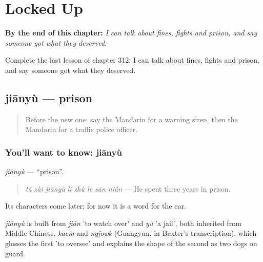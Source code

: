 
\chapter{Locked Up}
\label{ch:zh-locked-up}

\begin{chapteropening}
\textbf{By the end of this chapter:} \emph{I can talk about fines, fights and prison, and say someone got what they deserved.}

Complete the last lesson of chapter 312: I can talk about fines, fights and prison, and say someone got what they deserved.
\end{chapteropening}

\section[jiānyù]{jiānyù — prison}

\label{lesson:ZH-C312-jianyu}



\begin{quote}
Before the new one: say the Mandarin for a warning siren, then the Mandarin for a traffic police officer.
\end{quote}

\subsection*{You'll want to know: jiānyù}
\emph{jiānyù} — \textquotedblleft{}prison\textquotedblright{}.

\begin{quote}
\emph{tā zài jiānyù lǐ zhù le sān nián} — He spent three years in prison.
\end{quote}

Its characters come later; for now it is a word for the ear.

\begin{cousinweb}
\emph{jiānyù} is built from \emph{jiān} 'to watch over' and \emph{yù} 'a jail', both inherited from Middle Chinese, \emph{kaem} and \emph{ngjowk} (Guangyun, in Baxter's transcription), which glosses the first 'to oversee' and explains the shape of the second as two dogs on guard.
\end{cousinweb}

